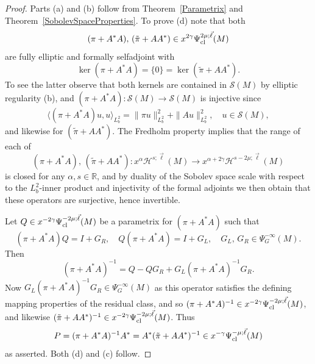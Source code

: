 \documentclass[reqno]{amsart}
\numberwithin{equation}{section}
\theoremstyle{definition}
\def\R{\mathbb R}
\def\S{\mathscr S}
\begin{document}
\begin{proof}
Parts (a) and (b) follow from Theorem~\ref{Parametrix} and Theorem~\ref{SobolevSpaceProperties}. To prove (d) note that both
$$
(\pi + A^*A),\, (\tilde{\pi} + AA^*) \in x^{2\gamma}\Psi_{\textup{cl}}^{2\mu;\vec{\ell}}(M)
$$
are fully elliptic and formally selfadjoint with
$$
\ker(\pi + A^*A) = \{0\} = \ker(\tilde{\pi} + AA^*).
$$
To see the latter observe that both kernels are contained in $\S(M)$ by elliptic regularity (b), and $(\pi + A^*A) : \S(M) \to \S(M)$ is injective since
$$
\langle (\pi + A^*A)u,u \rangle_{L^2_b} = \|\pi u\|_{L^2_b}^2 + \|Au\|_{L^2_b}^2, \quad u \in \S(M),
$$
and likewise for $(\tilde{\pi} + AA^*)$. The Fredholm property implies that the range of each of
$$
(\pi + A^*A),\, (\tilde{\pi} + AA^*) : x^{\alpha}{\mathscr H}^{s;\vec{\ell}}(M) \to x^{\alpha+2\gamma}{\mathscr H}^{s-2\mu;\vec{\ell}}(M) 
$$
is closed for any $\alpha,s \in \R$, and by duality of the Sobolev space scale with respect to the $L^2_b$-inner product and injectivity of the formal adjoints we then obtain that these operators are surjective, hence invertible.

Let $Q \in x^{-2\gamma}\Psi_{\textup{cl}}^{-2\mu;\vec{\ell}}(M)$ be a parametrix for $(\pi + A^*A)$ such that
$$
(\pi + A^*A)Q = I + G_R, \quad Q(\pi + A^*A) = I + G_L, \quad G_L,\,G_R \in \Psi^{-\infty}_G(M).
$$
Then
$$
(\pi + A^*A)^{-1} = Q - QG_R + G_L(\pi + A^*A)^{-1}G_R.
$$
Now $G_L(\pi + A^*A)^{-1}G_R \in \Psi^{-\infty}_G(M)$ as this operator satisfies the defining mapping properties of the residual class, and so $(\pi + A^*A)^{-1} \in x^{-2\gamma}\Psi_{\textup{cl}}^{-2\mu;\vec{\ell}}(M)$, and likewise $(\tilde{\pi} + AA^*)^{-1} \in x^{-2\gamma}\Psi_{\textup{cl}}^{-2\mu;\vec{\ell}}(M)$. Thus
$$
P = (\pi + A^*A)^{-1}A^* = A^*(\tilde{\pi} + AA^*)^{-1} \in x^{-\gamma}\Psi_{\textup{cl}}^{-\mu;\vec{\ell}}(M)
$$
as asserted. Both (d) and (c) follow.
\end{proof}

\end{document}
